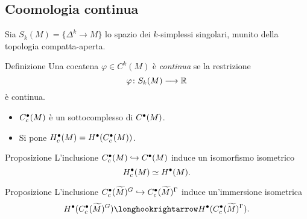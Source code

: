 \documentclass{beamer}
\begin{document}
\subsection*{Coomologia continua}
\begin{frame}{\secname}{\subsecname}
Sia $S_k(M)=\{\Delta^k\to M\}$ lo spazio dei $k$-simplessi singolari, munito della topologia compatta-aperta.
\begin{block}{Definizione}
Una cocatena $\varphi\in C^k(M)$ è \emph{continua} se la restrizione
\[
\map{\varphi}{S_k(M)}{\RR}
\]
è continua.
\end{block}
\begin{itemize}
\item $C^\bullet_c(M)$ è un sottocomplesso di $C^\bullet(M)$.
\item Si pone $H^\bullet_c(M)=H^\bullet(C^\bullet_c(M))$.
\end{itemize}
\end{frame}
\begin{frame}{\secname}{\subsecname}
\begin{block}{Proposizione}
L'inclusione $C^\bullet_c(M)\hookrightarrow C^\bullet(M)$ induce un isomorfismo isometrico
\[
H^\bullet_c(M)\simeq H^\bullet(M).
\]
\end{block}
\begin{block}{Proposizione}
L'inclusione $C^\bullet_c(\widetilde M)^G\hookrightarrow C^\bullet_c(\widetilde M)^\Gamma$ induce un'immersione isometrica
\[
H^\bul(C^\bul_c(\widetilde M)^G)\longhookrightarrow H^\bul(C^\bul_c(\widetilde M)^\Gamma).
\]
\end{block}
\end{frame}
\end{document}

